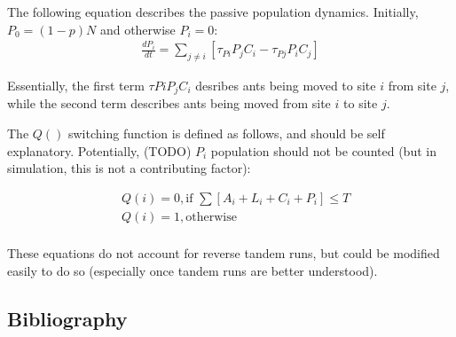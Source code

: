 \documentclass[letterpaper]{article}
\begin{document}
The following equation describes the passive population dynamics. Initially, $P_0 = (1-p)N$ and otherwise $P_i = 0$:
\begin{equation}
\begin{aligned}
  \frac{dP_i}{dt} = \sum_{j \neq i} [\tau_{Pi}P_jC_i - \tau_{Pj}P_iC_j]
\end{aligned}
\end{equation}

Essentially, the first term $\tau{Pi}P_jC_i$ desribes ants being moved to site $i$ from site $j$, while the second term describes ants being moved from site $i$ to site $j$.

The $Q()$ switching function is defined as follows, and should be self explanatory. Potentially, (TODO) $P_i$ population should not be counted (but in simulation, this is not a contributing factor):

\begin{equation}
\begin{aligned}
  & Q(i) = 0, \text{if    } \sum [A_i + L_i + C_i + P_i] \leq T \\
  & Q(i) = 1, \text{otherwise} \\
\end{aligned}
\end{equation}

These equations do not account for reverse tandem runs, but could be modified easily to do so (especially once tandem runs are better understood).

  \subsection{Bibliography}
      

\footnotesize


\end{document}
